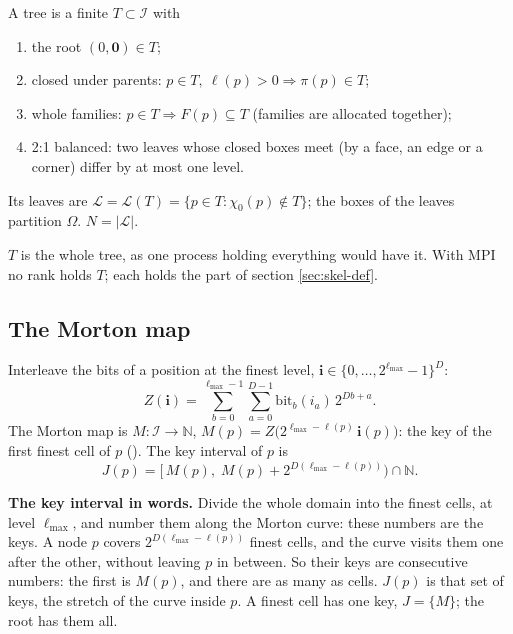 \begin{definition}
  \label{def:tree}
  A tree is a finite $T \subset \mathcal{I}$ with
  \begin{enumerate}[label=(T\arabic*)]
    \item the root $(0, \mathbf{0}) \in T$;
    \item closed under parents: $p \in T,\ \ell(p) > 0 \Rightarrow \pi(p)
      \in T$;
    \item whole families: $p \in T \Rightarrow F(p) \subseteq T$ (families
      are allocated together);
    \item 2:1 balanced: two leaves whose closed boxes meet (by a face, an
      edge or a corner) differ by at most one level.
  \end{enumerate}
  Its leaves are $\mathcal{L} = \mathcal{L}(T) = \{p \in T : \chi_0(p)
  \notin T\}$; the boxes of the leaves partition $\Omega$. $N = |\mathcal{L}|$.
\end{definition}

$T$ is the whole tree, as one process holding everything would have it.
With MPI no rank holds $T$; each holds the part of section
\ref{sec:skel-def}.

\subsection{The Morton map}

\begin{definition}
  Interleave the bits of a position at the finest level,
  $\mathbf{i} \in \{0, \ldots, 2^{\ell_{\max}} - 1\}^D$:
  \[
    Z(\mathbf{i}) = \sum_{b=0}^{\ell_{\max}-1} \sum_{a=0}^{D-1}
      \mathrm{bit}_b(i_a)\, 2^{D b + a}.
  \]
  The Morton map is $M : \mathcal{I} \to \mathbb{N}$, $M(p) =
  Z\big(2^{\ell_{\max} - \ell(p)}\, \mathbf{i}(p)\big)$: the key of the
  first finest cell of $p$ (). The key interval of
  $p$ is
  \[
    J(p) = \big[\, M(p),\; M(p) + 2^{D(\ell_{\max} - \ell(p))} \big)
      \cap \mathbb{N}.
  \]
\end{definition}

\textbf{The key interval in words.} Divide the whole domain into the
finest cells, at level $\ell_{\max}$, and number them along the Morton
curve: these numbers are the keys. A node $p$ covers $2^{D(\ell_{\max} -
\ell(p))}$ finest cells, and the curve visits them one after the other,
without leaving $p$ in between. So their keys are consecutive numbers: the
first is $M(p)$, and there are as many as cells. $J(p)$ is that set of
keys, the stretch of the curve inside $p$. A finest cell has one key, $J =
\{M\}$; the root has them all.


